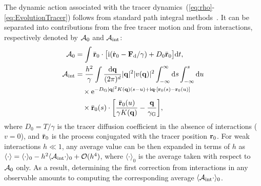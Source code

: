 \documentclass[superscriptaddress, twocolumn, prx, longbibliography, nofootinbib]{revtex4-1}
\begin{document}
The dynamic action associated with the tracer dynamics~(\ref{eq:rho}-\ref{eq:EvolutionTracer}) follows from standard path integral methods~\cite{Martin1973, Dominicis1975}. It can be separated into contributions from the free tracer motion and from interactions, respectively denoted by ${\cal A}_0$ and ${\cal A}_{\rm int}$:
\begin{equation}\label{eq:action_app}
	\begin{aligned}
		{\cal A}_0 &= \int \bar{\bf r}_0 \cdot \big[ {\rm i}(\dot{\bf r}_0 - {\bf F}_{\rm d}/\gamma) + D_0 \bar{\bf r}_0 \big] {\rm d}t ,
		\\
		{\cal A}_{\rm int} &= \frac{h^2}{\gamma} \int \frac{{\rm d}{\bf q}}{(2\pi)^d} |{\bf q}|^2 |v({\bf q})|^2 \int_{-\infty}^\infty {\rm d}s\int_{-\infty}^s{\rm d}u
		\\
		&\quad\times {\rm e}^{-D_{\rm G}|{\bf q}|^2K({\bf q})(s-u)+{\rm i}{\bf q}\cdot[{\bf r}_0(s)-{\bf r}_0(u)]}
		\\
		&\quad\times \bar{\bf r}_0(s) \cdot \bigg[ \frac{\bar{\bf r}_0(u)}{\gamma K({\bf q})} - \frac{{\bf q}}{\gamma_{\rm G}} \bigg] ,
	\end{aligned}
\end{equation}
where $D_0=T/\gamma$ is the tracer diffusion coefficient in the absence of interactions ($v=0$), and $\bar{\bf r}_0$ is the process conjugated with the tracer position ${\bf r}_0$. For weak interactions $h\ll1$, any average value can be then expanded in terms of $h$ as $\langle\cdot\rangle=\langle\cdot\rangle_0 - h^2 \langle{\cal A}_{\rm int}\cdot\rangle_0 + {\cal O}(h^4)$, where $\langle\cdot\rangle_0$ is the average taken with respect to ${\cal A}_0$ only. As a result, determining the first correction from interactions in any observable amounts to computing the corresponding average $\langle{\cal A}_{\rm int}\cdot\rangle_0$.
\end{document}
